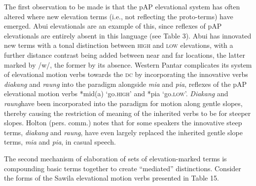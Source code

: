 The first observation to be made is that the pAP elevational system has often altered where new elevation terms (i.e., not reflecting the proto-terms) have emerged. Abui elevationals are an example of this, since reflexes of pAP elevationals are entirely absent in this language (see Table 3). Abui has innovated new terms with a tonal distinction between \textsc{high} and \textsc{low} elevations, with a further distance contrast being added between near and far locations, the latter marked by /w/, the former by its absence. Western Pantar complicates its system of elevational motion verbs towards the \textsc{dc} by incorporating the innovative verbs \textit{diakang} and \textit{raung} into the paradigm alongside \textit{mia} and \textit{pia}, reflexes of the pAP elevational motion verbs *mid(a) `go.\textsc{high'} and *pia `go.\textsc{low'.} \textit{Diakang} and \textit{raung}have been incorporated into the paradigm for motion along gentle slopes, thereby causing the restriction of meaning of the inherited verbs to be for steeper slopes. Holton (pers. comm.) notes that for some speakers the innovative steep terms, \textit{diakang} and \textit{raung}, have even largely replaced the inherited gentle slope terms, \textit{mia} and \textit{pia}, in casual speech. 

The second mechanism of elaboration of sets of elevation-marked terms is compounding basic terms together to create ``mediated'' distinctions. Consider the forms of the Sawila elevational motion verbs presented in Table 15. 

 


